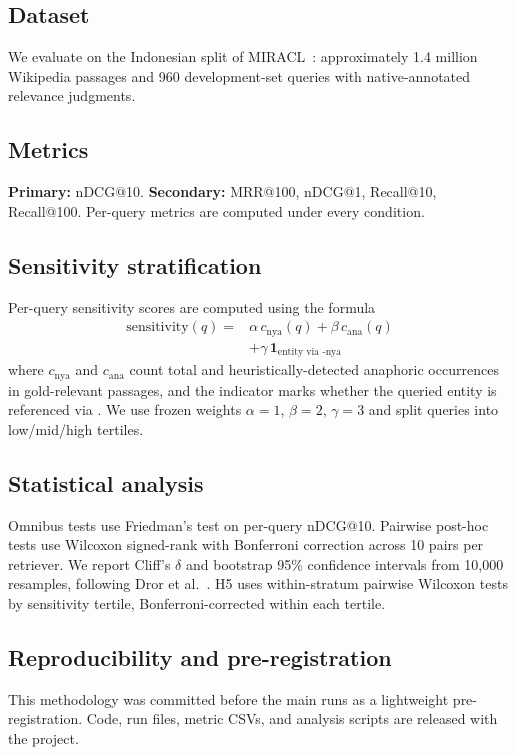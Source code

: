 \subsection{Dataset}

We evaluate on the Indonesian split of MIRACL~\cite{zhang2023miracl}: approximately 1.4 million Wikipedia passages and 960 development-set queries with native-annotated relevance judgments.

\subsection{Metrics}

\noindent\textbf{Primary:} nDCG@10. \textbf{Secondary:} MRR@100, nDCG@1, Recall@10, Recall@100. Per-query metrics are computed under every condition.

\subsection{Sensitivity stratification}

Per-query  sensitivity scores are computed using the formula
\begin{equation}
\begin{aligned}
\mathrm{sensitivity}(q) ={}& \alpha \, c_{\text{nya}}(q) + \beta \, c_{\text{ana}}(q) \\
&+ \gamma \, \mathbf{1}_{\text{entity via -nya}}
\end{aligned}
\label{eq:sensitivity}
\end{equation}
where $c_{\text{nya}}$ and $c_{\text{ana}}$ count total and heuristically-detected anaphoric  occurrences in gold-relevant passages, and the indicator marks whether the queried entity is referenced via . We use frozen weights $\alpha = 1$, $\beta = 2$, $\gamma = 3$ and split queries into low/mid/high tertiles.

\subsection{Statistical analysis}

Omnibus tests use Friedman's test on per-query nDCG@10. Pairwise post-hoc tests use Wilcoxon signed-rank with Bonferroni correction across 10 pairs per retriever. We report Cliff's $\delta$ and bootstrap 95\% confidence intervals from 10{,}000 resamples, following Dror et al.~\cite{dror2018hitchhiker}. H5 uses within-stratum pairwise Wilcoxon tests by sensitivity tertile, Bonferroni-corrected within each tertile.

\subsection{Reproducibility and pre-registration}

This methodology was committed before the main runs as a lightweight pre-registration. Code, run files, metric CSVs, and analysis scripts are released with the project.
